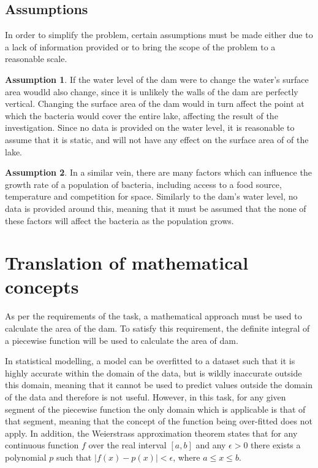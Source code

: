 \documentclass{article}
\theoremstyle{definition}
\newtheorem{assumption}{Assumption}
\begin{document}
    
    \subsection{Assumptions}
    
    In order to simplify the problem, certain assumptions must be made either due to a lack of information provided or to bring the scope of the problem to a reasonable scale.

    \begin{assumption}
    If the water level of the dam were to change the water's surface area woudld also change, since it is unlikely the walls of the dam are perfectly vertical. Changing the surface area of the dam would in turn affect the point at which the bacteria would cover the entire lake, affecting the result of the investigation. Since no data is provided on the water level, it is reasonable to assume that it is static, and will not have any effect on the surface area of of the lake.
    \end{assumption}

    \begin{assumption}
    In a similar vein, there are many factors which can influence the growth rate of a population of bacteria, including access to a food source, temperature and competition for space. Similarly to the dam's water level, no data is provided around this, meaning that it must be assumed that the none of these factors will affect the bacteria as the population grows.
    \end{assumption}
    
\section{Translation of mathematical concepts}

    As per the requirements of the task, a mathematical approach must be used to calculate the area of the dam. To satisfy this requirement, the definite integral of a piecewise function will be used to calculate the area of dam.

    In statistical modelling, a model can be overfitted to a dataset such that it is highly accurate within the domain of the data, but is wildly inaccurate outside this domain, meaning that it cannot be used to predict values outside the domain of the data and therefore is not useful. However, in this task, for any given segment of the piecewise function the only domain which is applicable is that of that segment, meaning that the concept of the function being over-fitted does not apply. In addition, the Weierstrass approximation theorem states that for any continuous function $f$ over the real interval $[a, b]$ and any $\epsilon > 0$ there exists a polynomial $p$ such that $|f(x) - p(x)| < \epsilon$, where $a \leq x \leq b$.
 
\end{document}
